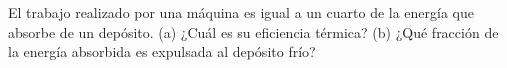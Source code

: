 \item El trabajo realizado por una máquina es igual a un cuarto de la energía que absorbe de un depósito. (a) ¿Cuál es su eficiencia térmica? (b) ¿Qué fracción de la energía absorbida es expulsada al depósito frío?
